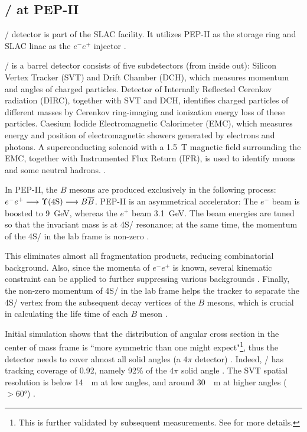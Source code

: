 \subsection{\BaBar/ at PEP-II}
\BaBar/ detector is part of the SLAC facility.
It utilizes PEP-II as the storage ring and SLAC linac as the $e^-e^+$
injector \cite{Harrison:1998yr}.

\BaBar/ is a barrel detector consists of five subdetectors (from inside out):
Silicon Vertex Tracker (SVT) and Drift Chamber (DCH), which measures momentum
and angles of charged particles.
Detector of Internally
Reflected Cerenkov radiation (DIRC), together with SVT and DCH, identifies
charged particles of different masses by Cerenkov ring-imaging and ionization
energy loss of these particles.
Caesium Iodide Electromagnetic Calorimeter (EMC), which measures energy and
position of electromagnetic showers generated by electrons and photons.
A superconducting solenoid with a \SI{1.5}{T} magnetic field surrounding the
EMC, together with Instrumented Flux Return (IFR), is used to identify muons and
some neutral hadrons. \cite{Lees:2013uzd}.

In PEP-II, the $B$ mesons are produced exclusively in the following process:
$e^- e^+ \longrightarrow \Y4S/ \longrightarrow B \overline{B}$.
PEP-II is an asymmetrical accelerator: The $e^-$ beam is boosted to \SI{9}{GeV},
whereas the $e^+$ beam \SI{3.1}{GeV}.
The beam energies are tuned so that the invariant mass is at \Y4S/ resonance;
at the same time, the momentum of the \Y4S/ in the lab frame is
non-zero \cite{Harrison:1998yr}.

This eliminates almost all fragmentation products, reducing combinatorial
background.
Also, since the momenta of $e^- e^+$ is known, several kinematic constraint
can be applied to further suppressing various
backgrounds \cite{Harrison:1998yr}.
Finally, the non-zero momentum of \Y4S/ in the lab frame helps the tracker to
separate the \Y4S/ vertex from the subsequent decay vertices of the $B$ mesons,
which is crucial in calculating the life time of each $B$
meson \cite{McGregor:2008ek}.

Initial simulation shows that the distribution of angular cross section in the
center of mass frame is ``more symmetric than one might expect"\footnote{
    This is further validated by subsequent measurements.
    See \cite{McGregor:2008ek} for more details.
}, thus the
detector needs to cover almost all solid angles
(a $4\pi$ detector) \cite{Boutigny:1995ib}.
Indeed, \BaBar/ has tracking coverage of 0.92, namely 92\% of the $4\pi$ solid
angle \cite{Harrison:1998yr}.
The SVT spatial resolution is below \SI{14}{\mu m} at low angles, and around
\SI{30}{\mu m} at higher angles ($> \ang{60}$) \cite{Harrison:1998yr}.

